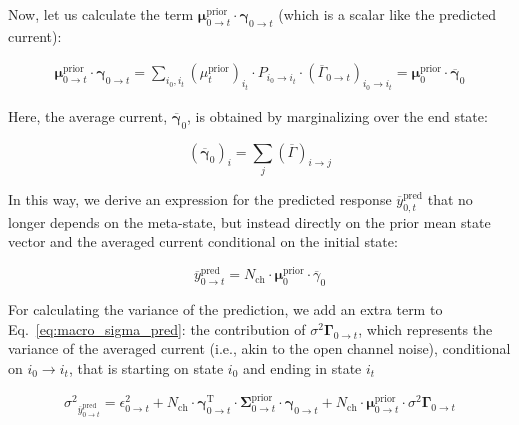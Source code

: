 \documentclass[pdflatex,sn-mathphys-num]{sn-jnl}%
\theoremstyle{thmstyleone}%
\theoremstyle{thmstyletwo}%
\theoremstyle{thmstylethree}%
\begin{document}
Now, let us calculate the term \( \mathbf{\mu}^{\text{prior}}_{0 \rightarrow t} \cdot \mathbf{\gamma}_{0 \rightarrow t} \) (which is a scalar like the predicted current):

\begin{multline}
	\mathbf{\mu}^{\text{prior}}_{0 \rightarrow t} \cdot \mathbf{\gamma}_{0 \rightarrow t} =
	\sum_{i_0, i_t} (\mu^{\text{prior}}_{t})_{i_t} \cdot P_{i_0 \rightarrow i_t} \cdot (\overline{\Gamma}_{0 \rightarrow t})_{i_0 \rightarrow i_t}
	= \mathbf{\mu}^{\text{prior}}_{0} \cdot \overline{\mathbf{\gamma}}_{0}
\end{multline}

Here, the average current, \( \overline{\mathbf{\gamma}}_{0} \), is obtained by marginalizing over the end state:

\begin{equation}
	(\overline{\mathbf{\gamma}}_{0})_i = \sum_j (\overline{\Gamma})_{i \rightarrow j}
\end{equation}

In this way, we derive an expression for the predicted response \( \overline{y}^{\text{pred}}_{0,t} \) that no longer depends on the meta-state, but instead directly on the prior mean state vector and the averaged current conditional on the initial state:

\begin{equation}
	\overline{y}^{\text{pred}}_{0 \rightarrow t} = N_{\text{ch}} \cdot \mathbf{\mu}^{\text{prior}}_{0} \cdot \overline{\gamma}_{0}
	\label{eq:macro_interval_predicted_y}
\end{equation}


For calculating the variance of the prediction, we add an extra term to Eq.~\ref{eq:macro_sigma_pred}: the contribution of ${\sigma^2 \mathbf{\Gamma}}_{0 \rightarrow t}$, which represents the variance of the averaged current (i.e., akin to the open channel noise), conditional on $i_0 \rightarrow i_t$, that is starting on state $i_0$ and ending in state $i_t$

\begin{equation}
	{\sigma^2}_{\overline{y}^{\mathrm{pred}}_{0 \rightarrow t}}
	= \epsilon^2_{0 \rightarrow t} + N_{\mathrm{ch}} \cdot \mathbf{\gamma}^{\mathrm{T}}_{0 \rightarrow t} \cdot \mathbf{\Sigma}^{\mathrm{prior}}_{0 \rightarrow t} \cdot \mathbf{\gamma}_{0 \rightarrow t}
	+ N_{\mathrm{ch}} \cdot \mathbf{\mu}^{\mathrm{prior}}_{0 \rightarrow t} \cdot {\sigma^2 \mathbf{\Gamma}}_{0 \rightarrow t}
	\label{eq:meta_macro_sigma_pred}
\end{equation}
\end{document}
